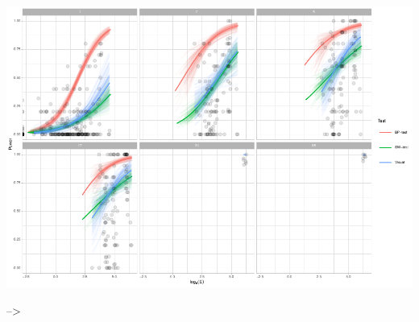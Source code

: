\documentclass[]{interact}
\theoremstyle{plain}%
\theoremstyle{definition}
\theoremstyle{remark}
\begin{document}
\includegraphics{paper_comparison_files/figure-latex/unnamed-chunk-20-1.pdf}

--\textgreater{}



\end{document}
